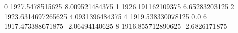 0 1927.5478515625 8.009521484375
1 1926.191162109375 6.65283203125
2 1923.6314697265625 4.0931396484375
4 1919.538330078125 0.0
6 1917.473388671875 -2.06494140625
8 1916.855712890625 -2.6826171875
